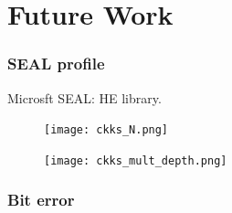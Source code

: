 \documentclass[10pt,handout]{beamer}
\begin{document}
\section{Future Work}
\begin{frame}
    \frametitle{SEAL profile}
Microsft SEAL: HE library.
    \begin{figure}
        \begin{minipage}[c]{0.49\linewidth}
            \texttt{[image: ckks\_N.png]}
        \end{minipage}
        \hfill
        \begin{minipage}[c]{0.49\linewidth}
            \texttt{[image: ckks\_mult\_depth.png]}
        \end{minipage}%
    \end{figure}
\end{frame}
\begin{frame}
    \frametitle{Bit error}

\end{frame}
\end{document}
